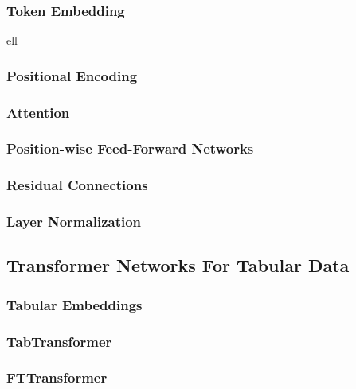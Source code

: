 \subsubsection{Token Embedding}\label{sec:token-embeddings}

\gls{ell}

\subsubsection{Positional Encoding}\label{sec:positional-encoding}

\subsubsection{Attention}\label{sec:attention}

\subsubsection{Position-wise Feed-Forward Networks}\label{sec:position-wise-ffn}

\subsubsection{Residual Connections}\label{sec:residual-connections}

\subsubsection{Layer Normalization}\label{sec:layer-norm}

\subsection{Transformer Networks For Tabular Data}\label{sec:tabular-transformer}

\subsubsection{Tabular Embeddings}\label{sec:tabular-embeddings}

\subsubsection{TabTransformer}\label{sec:tabtransformer}

\subsubsection{FTTransformer}\label{sec:fttransformer}


